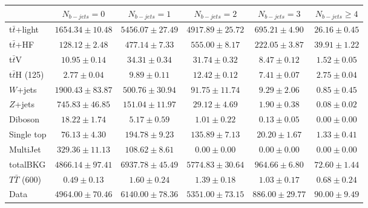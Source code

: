 \begin{tabular}{l c c c c c } \toprule
 & $N_{b-jets}= 0$ & $N_{b-jets}= 1$ & $N_{b-jets}= 2$ & $N_{b-jets}= 3$ & $N_{b-jets}\geq 4$ \\ \midrule 
 t$\bar{t}$+light & $1654.34 \pm 10.48$  & $5456.07 \pm 27.49$  & $4917.89 \pm 25.72$  & $695.21 \pm 4.90$  & $26.16 \pm 0.45$  \\ 
 t$\bar{t}$+HF & $128.12 \pm 2.48$  & $477.14 \pm 7.33$  & $555.00 \pm 8.17$  & $222.05 \pm 3.87$  & $39.91 \pm 1.22$  \\ \midrule 
 t$\bar{t}$V & $10.95 \pm 0.14$  & $34.31 \pm 0.34$  & $31.74 \pm 0.32$  & $8.47 \pm 0.12$  & $1.52 \pm 0.05$  \\ 
 t$\bar{t}$H (125) & $2.77 \pm 0.04$  & $9.89 \pm 0.11$  & $12.42 \pm 0.12$  & $7.41 \pm 0.07$  & $2.75 \pm 0.04$  \\ 
 $W$+jets & $1900.43 \pm 83.87$  & $500.76 \pm 30.94$  & $91.75 \pm 11.74$  & $9.29 \pm 2.06$  & $0.85 \pm 0.45$  \\ 
 $Z$+jets & $745.83 \pm 46.85$  & $151.04 \pm 11.97$  & $29.12 \pm 4.69$  & $1.90 \pm 0.38$  & $0.08 \pm 0.02$  \\ 
 Diboson & $18.22 \pm 1.74$  & $5.17 \pm 0.59$  & $1.01 \pm 0.22$  & $0.13 \pm 0.05$  & $0.00 \pm 0.00$  \\ 
 Single top & $76.13 \pm 4.30$  & $194.78 \pm 9.23$  & $135.89 \pm 7.13$  & $20.20 \pm 1.67$  & $1.33 \pm 0.41$  \\ 
 MultiJet & $329.36 \pm 11.13$  & $108.62 \pm 8.61$  & $0.00 \pm 0.00$  & $0.00 \pm 0.00$  & $0.00 \pm 0.00$  \\ \midrule 
 totalBKG & $4866.14 \pm 97.41$  & $6937.78 \pm 45.49$  & $5774.83 \pm 30.64$  & $964.66 \pm 6.80$  & $72.60 \pm 1.44$  \\ \midrule 
 $T\bar{T}$ (600) & $0.49 \pm 0.13$  & $1.60 \pm 0.24$  & $1.39 \pm 0.18$  & $1.03 \pm 0.17$  & $0.68 \pm 0.24$  \\ \midrule 
 Data & $4964.00 \pm 70.46$  & $6140.00 \pm 78.36$  & $5351.00 \pm 73.15$  & $886.00 \pm 29.77$  & $90.00 \pm 9.49$  \\ 
 \bottomrule\end{tabular}